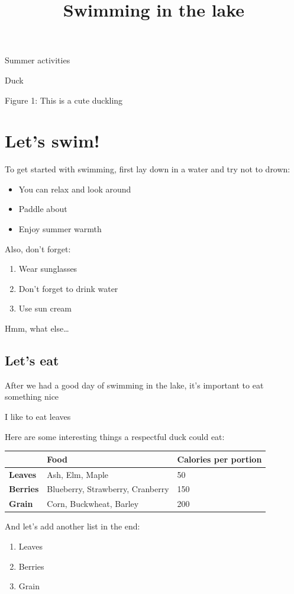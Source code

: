 \documentclass[11pt,a4paper]{article}
\title{Swimming in the lake}
\begin{document}
\maketitle

Summer activities

Duck

\begin{figure}[h]
\end{figure}

Figure 1: This is a cute duckling

\section{Let’s swim!}

To get started with swimming, first lay down in a water and try not to drown:

\begin{itemize}
\item You can relax and look around
\item Paddle about
\item Enjoy summer warmth
\end{itemize}

Also, don’t forget:

\begin{enumerate}
\item Wear sunglasses
\item Don’t forget to drink water
\item Use sun cream
\end{enumerate}

Hmm, what else…

\subsection{Let’s eat}

After we had a good day of swimming in the lake, it’s important to eat something nice

I like to eat leaves

Here are some interesting things a respectful duck could eat:

\begin{table}[h]
\begin{tabular}{|l|l|l|}
\hline
 & Food & Calories per portion \\ \hline
\textbf{Leaves} & Ash, Elm, Maple & 50 \\ \hline
\textbf{Berries} & Blueberry, Strawberry, Cranberry & 150 \\ \hline
\textbf{Grain} & Corn, Buckwheat, Barley & 200 \\ \hline
\end{tabular}
\end{table}

And let’s add another list in the end:

\begin{enumerate}
\item Leaves
\item Berries
\item Grain
\end{enumerate}
\end{document}
